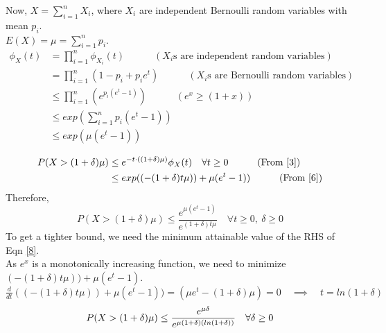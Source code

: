 \documentclass[11pt, fleqn]{article}
\begin{document}
\newpage
Now, $X = \sum_{i=1}^{n} X_i$, where $X_i$ are independent Bernoulli random variables with mean $p_i$.\\
$E(X) = \mu = \sum_{i=1}^{n} p_i$.\\
\begin{equation}
    \label{6}
    \begin{split}
        \phi_X(t) &= \prod_{i=1}^{n} \phi_{X_i}(t) \hspace{3em} (X_i \text{s are independent random variables}) \\
            &= \prod_{i=1}^{n} (1 - p_i + p_i e^{t}) \hspace{3em} (X_i \text{s are Bernoulli random variables}) \\
            &\le \prod_{i=1}^{n} (e^{p_i(e^t - 1)}) \hspace{3em} (e^x \ge (1 + x)) \\
            &\le exp(\sum_{i=1}^{n} p_i(e^t - 1)) \\
            &\le exp(\mu (e^t - 1)) \\
    \end{split}
\end{equation}
\begin{equation}
    \begin{split}
        P(X > (1 + \delta) \mu) &\le e^{-t \cdot ((1 + \delta) \mu)} \phi_X(t) \quad \forall t \ge 0 \hspace{3em} (\text{From \ref{3}}) \\
            &\le exp((-(1 + \delta) t \mu)) + \mu (e^t - 1)) \hspace{3em} (\text{From \ref{6}})
    \end{split}
\end{equation}
Therefore,
\begin{equation}
    \label{8}
    P(X > (1 + \delta) \mu) \le \frac{e^{\mu(e^t-1)}}{e^{(1+\delta)t\mu}} \quad \forall t \ge 0, \ \delta \ge 0
\end{equation}
To get a tighter bound, we need the minimum attainable value of the RHS of Eqn \ref{8}. \\
As $e^x$ is a monotonically increasing function, we need to minimize $(-(1 + \delta) t \mu)) + \mu (e^t - 1)$.\\
$\frac{d}{dt} ((-(1 + \delta) t \mu)) + \mu (e^t - 1)) = (\mu e^t - (1 + \delta) \mu) = 0 \quad \implies \quad t = ln(1 + \delta)$ \\
\begin{equation}
    P(X > (1 + \delta) \mu) \le \frac{e^{\mu\delta}}{e^{\mu(1+\delta)(ln(1 + \delta))}} \quad \forall \delta \ge 0 \\
\end{equation}
\end{document}
